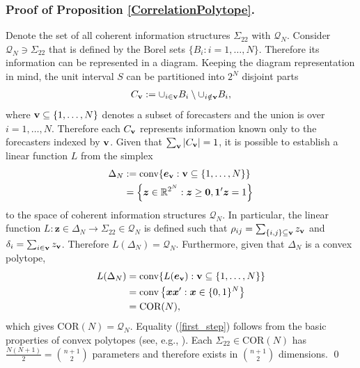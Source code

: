 \documentclass[11pt]{article}
\theoremstyle{definition}
\theoremstyle{definition}
\def\one{{\bf 1}}
\def\v{{\bf v}}
\begin{document}
\subsubsection{Proof of Proposition \ref{CorrelationPolytope}.}
Denote the set of all coherent information structures $\Sigma_{22}$ with $\mathcal{Q}_N$. Consider $\mathcal{Q}_N \ni \Sigma_{22}$ that is defined by the Borel sets $\{ B_i : i = 1, \dots, N\}$.  Therefore its information can be represented in a diagram. Keeping the diagram representation in mind, the unit interval $S$ can be partitioned into $2^N$ disjoint parts
\begin{align*}
C_\v := \cup_{i \in \v} B_i \setminus \cup_{i \notin \v} B_i,
\end{align*}
where $\v \subseteq \{1, \dots, N\}$ denotes a subset of forecasters and the union is over $i = 1, \dots, N$. Therefore each $C_\v$ represents information known only to the forecasters indexed by $\v$. Given that $\sum_{\v} |C_\v|  = 1$, it is possible to establish a linear function $L$ from the simplex
\begin{align*}
\Delta_N &:= \text{conv}\{  \boldsymbol{e}_\v : \v \subseteq \{1, \dots, N\} \}\\
&= \left\{ \boldsymbol{z} \in \mathbb{R}^{2^N} : \boldsymbol{z} \geq \boldsymbol{0}, \boldsymbol{1}'\boldsymbol{z} = 1 \right\}
\end{align*}
to the space of coherent information structures $\mathcal{Q}_N$. In particular, the linear function $L: \boldsymbol{z} \in \Delta_N \to \Sigma_{22} \in \mathcal{Q}_N$ is defined such that $\rho_{ij} = \sum_{\{i,j\} \subseteq \v} z_\v$ and $\delta_i =  \sum_{i \in \v} z_\v$. Therefore $L(\Delta_N) = \mathcal{Q}_N$. Furthermore, given that $\Delta_N$ is a convex polytope, 
\begin{align}
L(\Delta_N) &= \text{conv}\{  L(\boldsymbol{e}_\v) : \v \subseteq \{1, \dots, N\} \} \label{first_step}\\
&=  \text{conv} \left\{\boldsymbol{x}\boldsymbol{x}' : \boldsymbol{x}  \in \{0,1\}^N \right\} \nonumber\\
&= \text{COR}(N), \nonumber
\end{align}
which gives $\text{COR}(N) = \mathcal{Q}_N$. Equality (\ref{first_step}) follows from the basic properties of convex polytopes (see, e.g., \citealt{mcmullen1971convex}).  Each $\Sigma_{22} \in \text{COR}(N)$ has $\frac{N(N+1)}{2} = \binom{n+1}{2}$ parameters and therefore exists in $\binom{n+1}{2}$ dimensions. \qed
\end{document}
